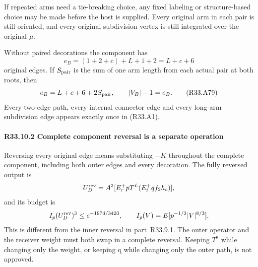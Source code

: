 If repeated arms need a tie-breaking choice, any fixed labeling or
structure-based choice may be made before the host is supplied.
Every original arm in each pair is still oriented, and every original
subdivision vertex is still integrated over the original \(\mu\).


Without paired decorations the component has
\[
e_B=(1+2+c)+L+1+2=L+c+6
\]
original edges. If \(S_{\rm pair}\) is the sum of one arm length from
each actual pair at both roots, then
\[
e_B=L+c+6+2S_{\rm pair},\qquad |V_B|-1=e_B.         \tag{R33.A79}
\]
Every two-edge path, every internal connector edge and every long-arm
subdivision edge appears exactly once in (R33.A1).

\paragraph{R33.10.2 Complete component reversal is a separate operation}

Reversing every original edge means substituting \(-K\) throughout
the complete component, including both outer edges and every
decoration. The fully reversed output is
\[
U_D^{\rm rev}
=A^2[E_r^+pT^L(E_t^+qf_2h_c)],
\]
and its budget is
\[
I_p(U_D^{\rm rev})^3\le e^{-197d/3420},\qquad
I_p(V)=E[p^{-1/3}|V|^{8/3}].
\]
This is different from the inner reversal in \mbox{\hyperref[part:R33.9.1]{part R33.9.1}}.
The outer operator and the receiver weight must both swap in a
complete reversal. Keeping \(T^2\) while changing only the weight,
or keeping q while changing only the outer path, is not approved.
